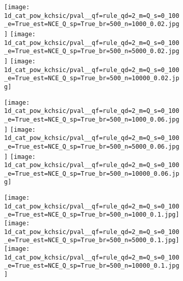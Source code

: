 \documentclass{article}%
\begin{document}
\normalsize


\begin{figure}[H]
\begin{subfigure}[t]{\linewidth}
\begin{subfigure}[H]{0.04\linewidth}
\hfill
\end{subfigure}
\begin{subfigure}[H]{0.32\linewidth}
\centering
{}
\end{subfigure}
\begin{subfigure}[H]{0.32\linewidth}
\centering
{}
\end{subfigure}
\begin{subfigure}[H]{0.32\linewidth}
\centering
{}
\end{subfigure}
\end{subfigure}
\begin{subfigure}[H]{\linewidth}
%
\texttt{[image: 1d\_cat\_pow\_kchsic/pval\_\_qf=rule\_qd=2\_m=Q\_s=0\_100\_e=True\_est=NCE\_Q\_sp=True\_br=500\_n=1000\_0.02.jpg]}%
\texttt{[image: 1d\_cat\_pow\_kchsic/pval\_\_qf=rule\_qd=2\_m=Q\_s=0\_100\_e=True\_est=NCE\_Q\_sp=True\_br=500\_n=5000\_0.02.jpg]}%
\texttt{[image: 1d\_cat\_pow\_kchsic/pval\_\_qf=rule\_qd=2\_m=Q\_s=0\_100\_e=True\_est=NCE\_Q\_sp=True\_br=500\_n=10000\_0.02.jpg]}%

\end{subfigure}
\begin{subfigure}[H]{\linewidth}
%
\texttt{[image: 1d\_cat\_pow\_kchsic/pval\_\_qf=rule\_qd=2\_m=Q\_s=0\_100\_e=True\_est=NCE\_Q\_sp=True\_br=500\_n=1000\_0.06.jpg]}%
\texttt{[image: 1d\_cat\_pow\_kchsic/pval\_\_qf=rule\_qd=2\_m=Q\_s=0\_100\_e=True\_est=NCE\_Q\_sp=True\_br=500\_n=5000\_0.06.jpg]}%
\texttt{[image: 1d\_cat\_pow\_kchsic/pval\_\_qf=rule\_qd=2\_m=Q\_s=0\_100\_e=True\_est=NCE\_Q\_sp=True\_br=500\_n=10000\_0.06.jpg]}%

\end{subfigure}
\begin{subfigure}[H]{\linewidth}
%
\texttt{[image: 1d\_cat\_pow\_kchsic/pval\_\_qf=rule\_qd=2\_m=Q\_s=0\_100\_e=True\_est=NCE\_Q\_sp=True\_br=500\_n=1000\_0.1.jpg]}%
\texttt{[image: 1d\_cat\_pow\_kchsic/pval\_\_qf=rule\_qd=2\_m=Q\_s=0\_100\_e=True\_est=NCE\_Q\_sp=True\_br=500\_n=5000\_0.1.jpg]}%
\texttt{[image: 1d\_cat\_pow\_kchsic/pval\_\_qf=rule\_qd=2\_m=Q\_s=0\_100\_e=True\_est=NCE\_Q\_sp=True\_br=500\_n=10000\_0.1.jpg]}%

\end{subfigure}
\end{figure}
\end{document}
